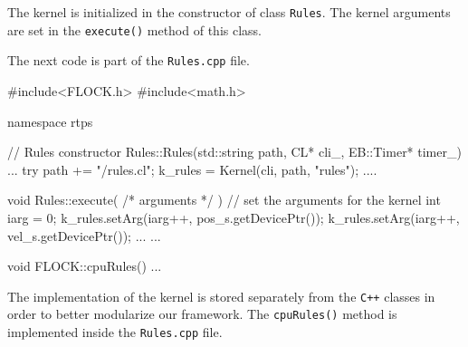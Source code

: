 The kernel is initialized in the constructor of class \texttt{Rules}. The kernel arguments are set in the \texttt{execute()} method of this class. 

The next code is part of the \texttt{Rules.cpp} file.

\begin{cppcode}{0}
#include<FLOCK.h>
#include<math.h>

namespace rtps
{
	// Rules constructor
	Rules::Rules(std::string path, CL* cli_, EB::Timer* timer_)
	{
		...
		try
		{
			path += "/rules.cl";
			k_rules = Kernel(cli, path, "rules");
		}
		....
	}

	void Rules::execute( /* arguments */ )
	{
		// set the arguments for the kernel
		int iarg = 0;
		k_rules.setArg(iarg++, pos_s.getDevicePtr());
		k_rules.setArg(iarg++, vel_s.getDevicePtr());
		...
	}
	...
	
	void FLOCK::cpuRules()
	{
		...
	}
}
\end{cppcode}

The implementation of the kernel is stored separately from the \texttt{C++} classes in order to better modularize our framework. The \texttt{cpuRules()} method is implemented inside the \texttt{Rules.cpp} file. 





